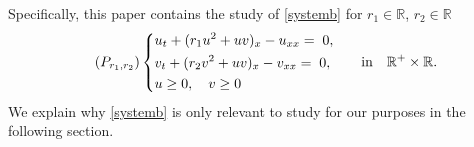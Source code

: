 \documentclass{amsart}
\theoremstyle{definition}
\numberwithin{equation}{section}
\begin{document}




Specifically, this paper contains the study of \eqref{systemb} for $r_1\in \mathbb{R}$, $r_2 \in \mathbb{R}$ %
\begin{equation}\label{systemb} \tag{$P_{r_1,r_2}$}
\begin{aligned}
&\left\{
\begin{aligned}
&u_{t} + ( r_{1}u^{2} + uv )_{x} -u_{xx} = \; 0, \\
&v_{t} + ( r_{2}v^{2} + uv )_{x} -v_{xx} = \; 0 ,\\
&u\ge0, \quad v\ge0
\end{aligned} \quad \quad \text{in} \quad \mathbb{R}^+\times \mathbb{R}.\right. %
\end{aligned}
\end{equation}
We explain why \eqref{systemb} is only relevant to study for our purposes in the following section.

% 
% 
\end{document}
